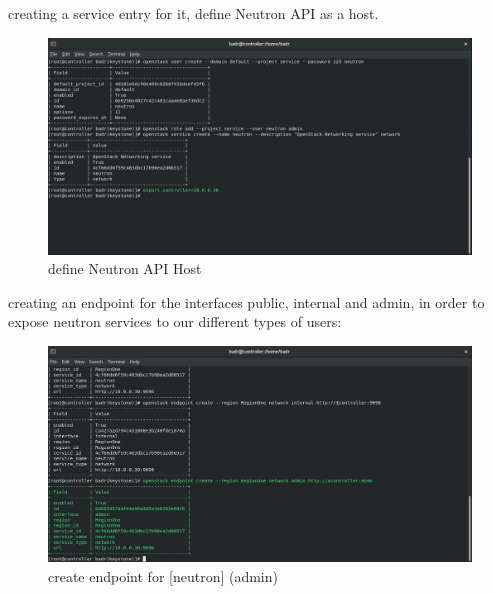 \begin{spacing}{1.2}
\par creating a service entry for it, define Neutron API as a host.
\\
\begin{figure}[!htb] 
\begin{center} 
\includegraphics[width=1\linewidth]{Cloud/Neutron Setup in Keystone/define Neutron API Host} 
\end{center} 
\caption{define Neutron API Host} 
\end{figure} 
\FloatBarrier

\par creating an endpoint for the interfaces
public, internal and admin, in order to expose neutron services to our different types of users: 
\\
\begin{figure}[!htb] 
\begin{center} 
\includegraphics[width=1\linewidth]{Cloud/Neutron Setup in Keystone/create endpoint for [neutron] (admin)} 
\end{center} 
\caption{create endpoint for [neutron] (admin)} 
\end{figure} 
\FloatBarrier


\end{spacing}
